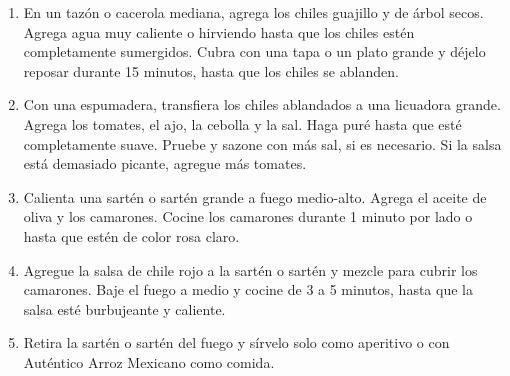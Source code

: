 \documentclass[letterpaper,17pt]{recipe}
\begin{document}
\begin{enumerate}
	\item En un tazón o cacerola mediana, agrega los chiles guajillo y de árbol secos. Agrega agua muy caliente o hirviendo hasta que los chiles estén completamente sumergidos. Cubra con una tapa o un plato grande y déjelo reposar durante 15 minutos, hasta que los chiles se ablanden.
	\item Con una espumadera, transfiera los chiles ablandados a una licuadora grande. Agrega los tomates, el ajo, la cebolla y la sal. Haga puré hasta que esté completamente suave. Pruebe y sazone con más sal, si es necesario. Si la salsa está demasiado picante, agregue más tomates.
	\item Calienta una sartén o sartén grande a fuego medio-alto. Agrega el aceite de oliva y los camarones. Cocine los camarones durante 1 minuto por lado o hasta que estén de color rosa claro.
	\item Agregue la salsa de chile rojo a la sartén o sartén y mezcle para cubrir los camarones. Baje el fuego a medio y cocine de 3 a 5 minutos, hasta que la salsa esté burbujeante y caliente.
	\item Retira la sartén o sartén del fuego y sírvelo solo como aperitivo o con Auténtico Arroz Mexicano como comida.
\end{enumerate}
\end{document}
